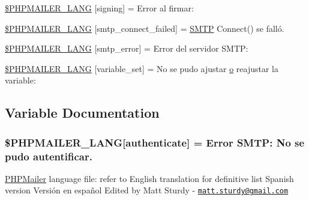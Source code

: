 \begin{DoxyCompactItemize}
\item 
\hyperlink{phpmailer_8lang-es_8php_a68e437bdb9b968a5a67320f03d231565}{\$\+P\+H\+P\+M\+A\+I\+L\+E\+R\+\_\+\+L\+A\+NG} \mbox{[}\textquotesingle{}signing\textquotesingle{}\mbox{]} = \textquotesingle{}Error al firmar\+: \textquotesingle{}
\item 
\hyperlink{phpmailer_8lang-es_8php_a7b321d4ca1e9df702403ed4c61aa0980}{\$\+P\+H\+P\+M\+A\+I\+L\+E\+R\+\_\+\+L\+A\+NG} \mbox{[}\textquotesingle{}smtp\+\_\+connect\+\_\+failed\textquotesingle{}\mbox{]} = \textquotesingle{}\hyperlink{class_s_m_t_p}{S\+M\+TP} Connect() se falló.\textquotesingle{}
\item 
\hyperlink{phpmailer_8lang-es_8php_a7d9cffba1e669c845f8a4c891ee50064}{\$\+P\+H\+P\+M\+A\+I\+L\+E\+R\+\_\+\+L\+A\+NG} \mbox{[}\textquotesingle{}smtp\+\_\+error\textquotesingle{}\mbox{]} = \textquotesingle{}Error del servidor S\+M\+T\+P\+: \textquotesingle{}
\item 
\hyperlink{phpmailer_8lang-es_8php_af795debc7a739d038742691c358d9032}{\$\+P\+H\+P\+M\+A\+I\+L\+E\+R\+\_\+\+L\+A\+NG} \mbox{[}\textquotesingle{}variable\+\_\+set\textquotesingle{}\mbox{]} = \textquotesingle{}No se pudo ajustar \hyperlink{fullpage_2plugin_8min_8js_a4afc7c854f61c136d7bcfa8997651b88}{o} reajustar la variable\+: \textquotesingle{}
\end{DoxyCompactItemize}


\subsection{Variable Documentation}
\subsubsection[{\texorpdfstring{\$\+P\+H\+P\+M\+A\+I\+L\+E\+R\+\_\+\+L\+A\+NG}{$PHPMAILER_LANG}}]{\setlength{\rightskip}{0pt plus 5cm}\$P\+H\+P\+M\+A\+I\+L\+E\+R\+\_\+\+L\+A\+NG\mbox{[}\textquotesingle{}authenticate\textquotesingle{}\mbox{]} = \textquotesingle{}Error S\+M\+T\+P\+: No se pudo autentificar.\textquotesingle{}}\hypertarget{phpmailer_8lang-es_8php_a2cb33073c989b85580748e331ed8b4aa}{}\label{phpmailer_8lang-es_8php_a2cb33073c989b85580748e331ed8b4aa}
\hyperlink{class_p_h_p_mailer}{P\+H\+P\+Mailer} language file\+: refer to English translation for definitive list Spanish version Versión en español Edited by Matt Sturdy -\/ \href{mailto:matt.sturdy@gmail.com}{\tt matt.\+sturdy@gmail.\+com} 

